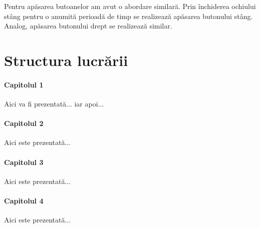 Pentru apăsarea butoanelor am avut o abordare similară.
Prin închiderea ochiului stâng pentru o anumită perioadă de timp se realizează apăsarea butonului stâng.
Analog, apăsarea butonului drept se realizează similar.

\section*{Structura lucrării}

\paragraph{Capitolul 1}
Aici va fi prezentată... iar apoi...

\paragraph{Capitolul 2}
Aici este prezentată...

\paragraph{Capitolul 3}
Aici este prezentată...

\paragraph{Capitolul 4}
Aici este prezentată...